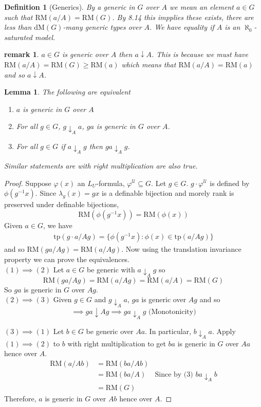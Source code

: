 \documentclass[letterpaper, 12pt]{article}
\newcommand{\fin}{\qquad \quad \hfill \framebox[1.75mm][l]{\,}}
\newcommand{\cU}{\mathcal{U}}
\newcommand{\tp}{\mbox{tp}}
\newcommand{\RM}{\mbox{RM}}
\newcommand{\dM}{\mbox{dM}}
\newcommand{\da}{\downarrow}
\theoremstyle{stdthm}
\newtheorem{lem}[thm]{Lemma}
\theoremstyle{stddef}
\newtheorem{defn}[thm]{Definition}
\newtheorem{rem}[thm]{remark} %
\theoremstyle{stdnonum}
\theoremstyle{stdqands}
\theoremstyle{stdbold}
\begin{document}
\begin{defn}[Generics]
By a generic in $G$ over $A$ we mean an element $a \in G$ such that $\RM(a/A) = \RM(G)$. By 8.14 this impplies these exists, there are less than $\dM(G)$-many generic types over $A$. We have equality if $A$ is an $\aleph_0$-saturated model. 

\end{defn}


\begin{rem}
$a \in G$ is generic over $A$ then $a \da A$. This is because we must have $\RM(a/A) = \RM(G) \geq \RM(a)$ which means that $\RM(a/A) = \RM(a)$ and so $a \da A$. 
\end{rem}

\begin{lem}
The following are equivalent
\begin{enumerate}
\item $a$ is generic in $G$ over $A$
\item For all $g \in G$, $g \da_A a$, $ga$ is generic in $G$ over $A$. 
\item For all $g \in G$ if $a \da_A g$ then $ga \da_A g$. 
\end{enumerate}
Similar statements are with right multiplication are also true. 
\end{lem}

\begin{proof}
Suppose $\varphi(x)$ an $L_U$-formula, $\varphi^\cU \subseteq G$. Let $g \in G$. $g \cdot \varphi^\cU$ is defined by $\phi(g^{-1}x)$. Since $\lambda_g(x) = gx$ is a definable bijection and morely rank is preserved under definable bijections, 
\[ \RM(\phi(g^{-1}x)) = \RM(\phi(x)) \] 
Given $a \in G$, we have
\begin{align*}
\tp(g\cdot a/Ag) = \{\phi(g^{-1}x): \phi(x) \in \tp(a/Ag)\} 
\end{align*}
and so $\RM(ga/Ag) = \RM(a/Ag)$. Now using the translation invariance property we can prove the equivalences. \\

$(1)\implies (2)$ Let $a\in G$ be generic with $a\da_A g$ so 
\[ \RM(ga/Ag) = \RM(a/Ag) = \RM(a/A) = \RM(G) \]
So $ga$ is generic in $G$ over $Ag$.  \\

$(2)\implies (3)$ Given $g \in G$ and $g\da_A a$, $ga$ is generic over $Ag$ and so 
\[ \implies ga \da Ag \implies ga \da_A g \mbox{ (Monotonicity)} \]

$(3)\implies (1)$ Let $b \in G$ be generic over $Aa$. In particular, $b \da_A a$. Apply $(1)\implies (2)$ to $b$ with right multiplication to get $ba$ is generic in $G$ over $Aa$ hence over $A$. 
\begin{align*}
\RM(a/Ab) &= \RM(ba/Ab) \\
&= \RM(ba/A) &\mbox{Since by (3) $ba\da_A b$}\\
&= \RM(G)
\end{align*}
Therefore, $a$ is generic in $G$ over $Ab$ hence over $A$. 
\end{proof}
\end{document}
